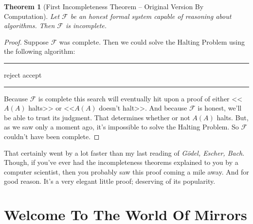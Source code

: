 \documentclass{article}
\newtheorem{theorem}{Theorem}
\newcommand{\F}{\ensuremath{\mathcal{F}}}
\newenvironment{algo}{\begin{samepage}\medskip\hrule\begin{algorithmic}[H]}{\end{algorithmic}\hrule\medskip\end{samepage}}
\begin{document}
\begin{theorem}[First Incompleteness Theorem -- Original Version By Computation]
\label{original-first-by-computation}
Let $\F$ be an honest formal system capable of reasoning about algorithms. Then $\F$ is incomplete.
\end{theorem}

\begin{proof}
Suppose $\F$ was complete. Then we could solve the Halting Problem using the following algorithm:
\begin{algo}
      \State reject
    \EndIf
      \State accept
    \EndIf
  \EndFor
\EndFunction
\end{algo}
Because $\F$ is complete this search will eventually hit upon a proof of  either <<$A(A)$ halts>> or <<$A(A)$ doesn't halt>>. And because $\F$ is honest, we'll be able to trust its judgment. That determines whether or not $A(A)$ halts. But, as we saw only a moment ago, it's impossible to solve the Halting Problem. So $\F$ couldn't have been complete. \lightning
\end{proof}

That certainly went by a lot faster than my last reading of \textit{Gödel, Escher, Bach}. Though, if you've ever had the incompleteness theorems explained to you by a computer scientist, then you probably saw this proof coming a mile away. And for good reason. It's a very elegant little proof; deserving of its popularity.

\section{Welcome To The World Of Mirrors}
\end{document}
